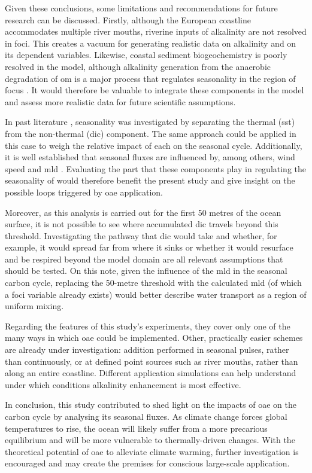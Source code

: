 Given these conclusions, some limitations and recommendations for future research can be discussed. Firstly, although the European coastline accommodates multiple river mouths, riverine inputs of alkalinity are not resolved in \ac{foci}. This creates a vacuum for generating realistic data on alkalinity and on its dependent variables. Likewise, coastal sediment biogeochemistry is poorly resolved in the model, although alkalinity generation from the anaerobic degradation of \ac{om} is a major process that regulates seasonality in the region of focus \citep{thomas2009enhanced}. It would therefore be valuable to integrate these components in the model and assess more realistic data for future scientific assumptions. 

In past literature \citep{schwinger2022report, fassbender2022quantifying},  seasonality was investigated by separating the thermal (\ac{sst}) from the non-thermal (\ac{dic}) component. The same approach could be applied in this case to weigh the relative impact of each on the seasonal  cycle. Additionally, it is well established that seasonal  fluxes are influenced by, among others, wind speed \citep{jones2014spatial} and \ac{mld} \citep{jo2022future, jones2014spatial}. Evaluating the part that these components play in regulating the seasonality of  would therefore benefit the present study and give insight on the possible loops triggered by \ac{oae} application.

Moreover, as this analysis is carried out for the first 50 metres of the ocean surface, it is not possible to see where accumulated \ac{dic} travels beyond this threshold. Investigating the pathway that \ac{dic} would take and whether, for example, it would spread far from where it sinks or whether it would resurface and be respired beyond the model domain are all relevant assumptions that should be tested. On this note, given the influence of the \ac{mld} in the seasonal carbon cycle, replacing the 50-metre threshold with the calculated \ac{mld} (of which a \ac{foci} variable already exists) would better describe water transport as a region of uniform mixing. 

Regarding the features of this study's experiments, they cover only one of the many ways in which \ac{oae} could be implemented. Other, practically easier schemes are already under investigation: addition performed in seasonal pulses, rather than continuously, or at defined point sources such as river mouths, rather than along an entire coastline. Different application simulations can help understand under which conditions alkalinity enhancement is most effective.

In conclusion, this study contributed to shed light on the impacts of \ac{oae} on the carbon cycle by analysing its seasonal fluxes. As climate change forces global temperatures to rise, the ocean will likely suffer from a more precarious equilibrium and will be more vulnerable to thermally-driven changes. With the theoretical potential of \ac{oae} to alleviate climate warming, further investigation is encouraged and may create the premises for conscious large-scale application. 
